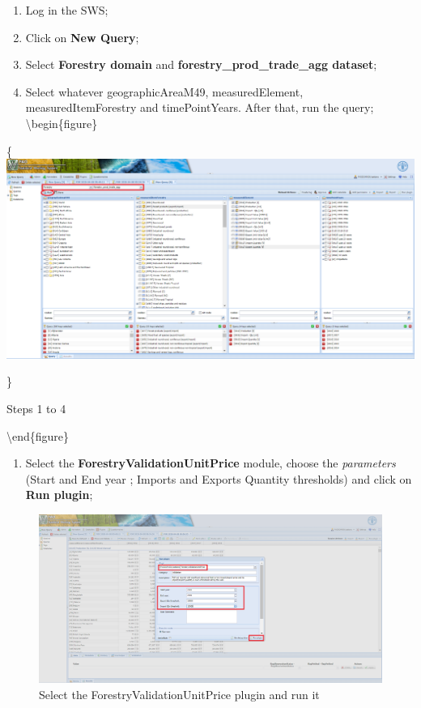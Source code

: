 \documentclass[
]{book}
\providecommand{\tightlist}{%
  \setlength{\itemsep}{0pt}\setlength{\parskip}{0pt}}
\begin{document}
\begin{enumerate}
\def\labelenumi{\arabic{enumi}.}
\item
  Log in the SWS;
\item
  Click on \textbf{New Query};
\item
  Select \textbf{Forestry domain} and \textbf{forestry\_prod\_trade\_agg dataset};
\item
  Select whatever geographicAreaM49, measuredElement, measuredItemForestry and timePointYears. After that, run the query;
  \textbackslash begin\{figure\}
\end{enumerate}

\{\centering \includegraphics[width=1\linewidth]{images/forestry_prod_trade_agg_query}

\}

\caption{Steps 1 to 4}

\label{fig:queryUnitPrice}
\textbackslash end\{figure\}

\begin{enumerate}
\def\labelenumi{\arabic{enumi}.}
\setcounter{enumi}{4}
\tightlist
\item
  Select the \textbf{ForestryValidationUnitPrice} module, choose the \emph{parameters} (Start and End year ; Imports and Exports Quantity thresholds) and click on \textbf{Run plugin};
\end{enumerate}

\begin{figure}

{\centering \includegraphics[width=1\linewidth]{images/forestry_select_plugin_unit_price} 

}

\caption{Select the ForestryValidationUnitPrice plugin and run it}\label{fig:UnitPricePlugin}
\end{figure}
\end{document}
